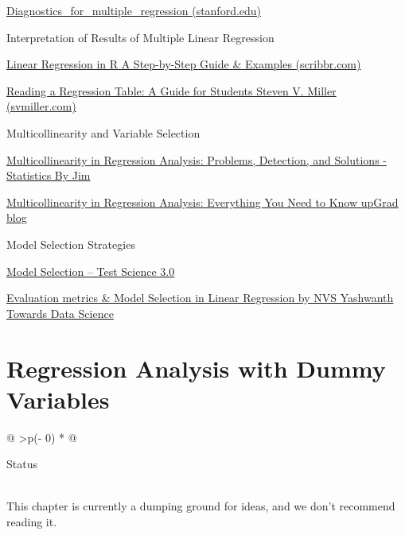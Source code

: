 \documentclass[
  letterpaper,
  paper =a4,
  twoside,
  openright,
  headsepline,
  footsepline,
  listof = totocnumbered,
  chapterprefix = true,
  firstiscover]{scrbook}
\begin{document}
\href{https://web.stanford.edu/class/stats191/notebooks/Diagnostics_for_multiple_regression.html}{Diagnostics\_for\_multiple\_regression
(stanford.edu)}

Interpretation of Results of Multiple Linear Regression

\href{https://www.scribbr.com/statistics/linear-regression-in-r/}{Linear
Regression in R \textbar{} A Step-by-Step Guide \& Examples
(scribbr.com)}

\href{http://svmiller.com/blog/2014/08/reading-a-regression-table-a-guide-for-students/}{Reading
a Regression Table: A Guide for Students \textbar{} Steven V. Miller
(svmiller.com)}

Multicollinearity and Variable Selection

\href{https://statisticsbyjim.com/regression/multicollinearity-in-regression-analysis/}{Multicollinearity
in Regression Analysis: Problems, Detection, and Solutions - Statistics
By Jim}

\href{https://www.upgrad.com/blog/multicollinearity-in-regression-analysis/}{Multicollinearity
in Regression Analysis: Everything You Need to Know \textbar{} upGrad
blog}

Model Selection Strategies

\href{https://testscience.org/analyze-test-data/inferential/benefits-of-statistical-modeling/model-selection/\#:~:text=There\%20are\%20several\%20model\%20building\%20strategies\%20available\%20using,to\%20regularization\%20approaches\%20\%28ridge\%20regression\%2C\%20LASSO\%2C\%20elastic\%20net\%29.}{Model
Selection -- Test Science 3.0}

\href{https://towardsdatascience.com/evaluation-metrics-model-selection-in-linear-regression-73c7573208be}{Evaluation
metrics \& Model Selection in Linear Regression \textbar{} by NVS
Yashwanth \textbar{} Towards Data Science}


\hypertarget{regression-analysis-with-dummy-variables}{%
\chapter{Regression Analysis with Dummy
Variables}\label{regression-analysis-with-dummy-variables}}

\begin{longtable}[]{@{}
  >{\centering\arraybackslash}p{(\columnwidth - 0\tabcolsep) * }@{}}
\toprule\noalign{}
\begin{minipage}[b]{\linewidth}\centering
Status
\end{minipage} \\
\midrule\noalign{}
\endhead
\bottomrule\noalign{}
\endlastfoot
This chapter is currently a dumping ground for ideas, and we don't
recommend reading it. \\
\end{longtable}
\end{document}

